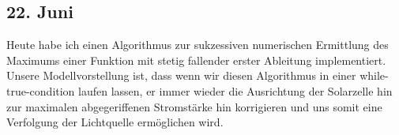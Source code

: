 \subsection{22. Juni}
Heute habe ich einen Algorithmus zur sukzessiven numerischen Ermittlung des Maximums einer Funktion mit stetig fallender erster Ableitung implementiert. Unsere Modellvorstellung ist, dass wenn wir diesen Algorithmus in einer while-true-condition laufen lassen, er immer wieder die Ausrichtung der Solarzelle hin zur maximalen abgegeriffenen Stromstärke hin korrigieren und uns somit eine Verfolgung der Lichtquelle ermöglichen wird.